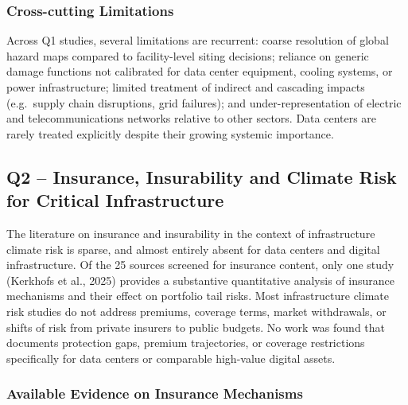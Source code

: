 \subsubsection{Cross-cutting Limitations}

Across Q1 studies, several limitations are recurrent: coarse resolution of
global hazard maps compared to facility-level siting decisions; reliance on
generic damage functions not calibrated for data center equipment, cooling
systems, or power infrastructure; limited treatment of indirect and
cascading impacts (e.g.\ supply chain disruptions, grid failures); and
under-representation of electric and telecommunications networks relative
to other sectors. Data centers are rarely treated explicitly despite their
growing systemic importance.


\subsection{Q2 – Insurance, Insurability and Climate Risk for Critical Infrastructure}
\label{app:literature_q2}

The literature on insurance and insurability in the context of infrastructure
climate risk is sparse, and almost entirely absent for data centers and
digital infrastructure. Of the 25 sources screened for insurance content, only
one study (Kerkhofs et al., 2025) provides a substantive quantitative analysis
of insurance mechanisms and their effect on portfolio tail risks. Most
infrastructure climate risk studies do not address premiums, coverage terms,
market withdrawals, or shifts of risk from private insurers to public budgets.
No work was found that documents protection gaps, premium trajectories, or
coverage restrictions specifically for data centers or comparable high-value
digital assets.

\subsubsection{Available Evidence on Insurance Mechanisms}

